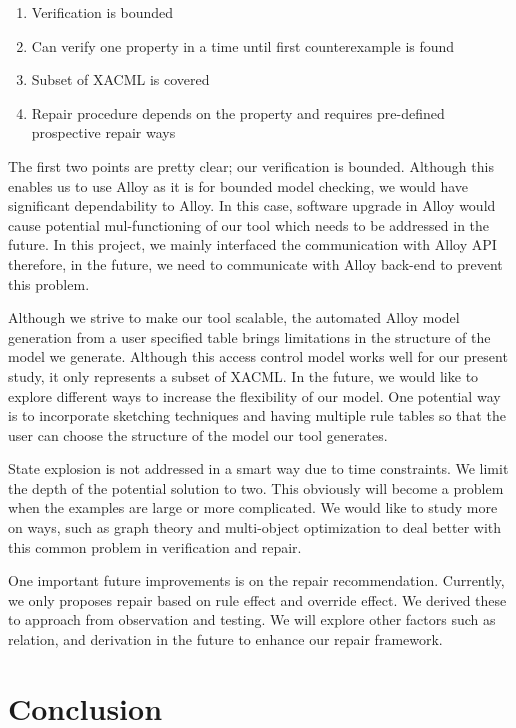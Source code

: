 \documentclass{acm_proc_article-sp}
\begin{document}
\begin{enumerate}
\item Verification is bounded
\item Can verify one property in a time until first counterexample is found
\item Subset of XACML is covered
\item Repair procedure depends on the property and requires pre-defined prospective repair ways
\end{enumerate}

The first two points are pretty clear; our verification is bounded. Although this enables us to use Alloy as it is for bounded model checking, we would have significant dependability to Alloy. In this case, software upgrade in Alloy would cause potential mul-functioning of our tool which needs to be addressed in the future. In this project, we mainly interfaced the communication with Alloy API therefore, in the future, we need to communicate with Alloy back-end to prevent this problem.

Although we strive to make our tool scalable, the automated Alloy model generation from a user specified table brings limitations in the structure of the model we generate. Although this access control model works well for our present study, it only represents a subset of XACML. In the future, we would like to explore different ways to increase the flexibility of our model. One potential way is to incorporate sketching techniques and having multiple rule tables so that the user can choose the structure of the model our tool generates.

State explosion is not addressed in a smart way due to time constraints. We limit the depth of the potential solution to two. This obviously will become a problem when the examples are large or more complicated. We would like to study more on ways, such as graph theory and multi-object optimization to deal better with this common problem in verification and repair.

One important future improvements is on the repair recommendation. Currently, we only proposes repair based on rule effect and override effect. We derived these to approach from observation and testing. We will explore other factors such as relation, and derivation in the future to enhance our repair framework.

\section{Conclusion}
\end{document}

